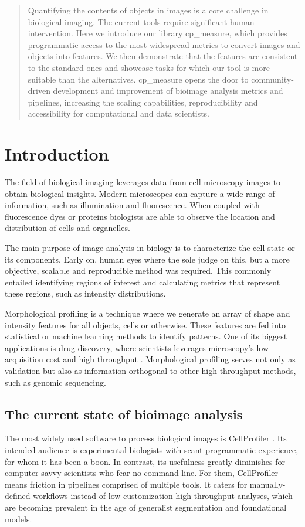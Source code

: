\documentclass{article}
\begin{document}
\begin{abstract}
Quantifying the contents of objects in images is a core challenge in biological imaging. The current tools require significant human intervention. Here we introduce our library cp\_measure, which provides programmatic access to the most widespread metrics to convert images and objects into features. We then demonstrate that the features are consistent to the standard ones and showcase tasks for which our tool is more suitable than the alternatives. cp\_measure opens the door to community-driven development and improvement of bioimage analysis metrics and pipelines, increasing the scaling capabilities, reproducibility and accessibility for computational and data scientists.
\end{abstract}
\section{Introduction}
\label{sec:org4c9ba67}
The field of biological imaging leverages data from cell microscopy images to obtain biological insights. Modern microscopes can capture a wide range of information, such as illumination and fluorescence. When coupled with fluorescence dyes or proteins biologists are able to observe the location and distribution of cells and organelles.

The main purpose of image analysis in biology is to characterize the cell state or its components. Early on, human eyes where the sole judge on this, but a more objective, scalable and reproducible method was required. This commonly entailed identifying regions of interest and calculating metrics that represent these regions, such as intensity distributions.

Morphological profiling is a technique where we generate an array of shape and intensity features for all objects, cells or otherwise. These features are fed into statistical or machine learning methods to identify patterns. One of its biggest applications is drug discovery, where scientists leverages microscopy's low acquisition cost and high throughput \citep{sealDecadeSystematicReview2024}. Morphological profiling serves not only as validation but also as information orthogonal to other high throughput methods, such as genomic sequencing.
\subsection{The current state of bioimage analysis}
\label{sec:org8f5b33d}
The most widely used software to process biological images is CellProfiler \citep{stirlingCellProfiler4Improvements2021}. Its intended audience is experimental biologists with scant programmatic experience, for whom it has been a boon. In contrast, its usefulness greatly diminishes for computer-savvy scientists who fear no command line. For them, CellProfiler means friction in pipelines comprised of multiple tools. It caters for manually-defined workflows instead of low-customization high throughput analyses, which are becoming prevalent in the age of generalist segmentation and foundational models.
\end{document}
